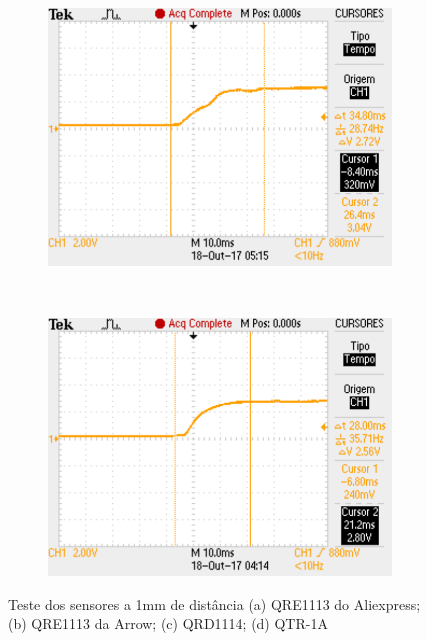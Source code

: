 \begin{frame}
\begin{figure}[h]
     \captionsetup{width=\textwidth,font=footnotesize,textfont=bf}
     \begin{subfigure}[b]{0.3\textwidth}
 	\centering
         \includegraphics[width=\textwidth,height=\textheight,keepaspectratio]{figuras/TestePaulo1mm.pdf}
         \caption{\centering \label{fig:TestePaulo1mm}}
     \end{subfigure}
     ~ 
     \begin{subfigure}[b]{0.3\textwidth}
 	\centering
         \includegraphics[width=\textwidth,height=\textheight,keepaspectratio]{figuras/TestePololu1mm.pdf}
         \caption{\centering \label{fig:TestePololu1mm}}
     \end{subfigure}

	\caption{Teste dos sensores a 1mm de distância (a) QRE1113 do Aliexpress; (b) QRE1113 da Arrow; (c) QRD1114; (d) QTR-1A}
 \end{figure}
\end{frame}


